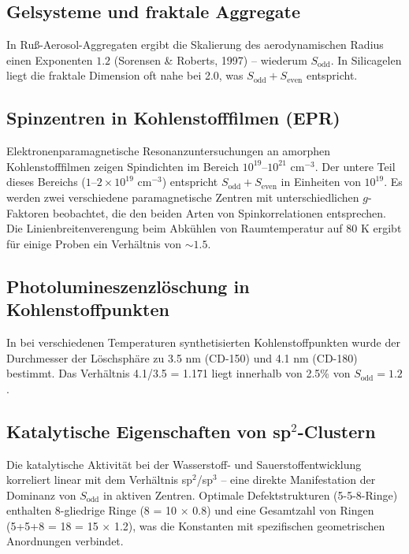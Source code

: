 \documentclass[12pt,a4paper]{article}
\begin{document}
	\subsection{Gelsysteme und fraktale Aggregate}
	In Ruß-Aerosol-Aggregaten ergibt die Skalierung des aerodynamischen Radius einen Exponenten \(1.2\) (Sorensen \& Roberts, 1997) -- wiederum \(S_{\text{odd}}\). In Silicagelen liegt die fraktale Dimension oft nahe bei 2.0, was \(S_{\text{odd}}+S_{\text{even}}\) entspricht.
	
	\subsection{Spinzentren in Kohlenstofffilmen (EPR)}
	Elektronenparamagnetische Resonanzuntersuchungen an amorphen Kohlenstofffilmen zeigen Spindichten im Bereich \(10^{19}\)--\(10^{21}\) cm\({}^{-3}\). Der untere Teil dieses Bereichs (\(1\)--\(2\times10^{19}\) cm\({}^{-3}\)) entspricht \(S_{\text{odd}}+S_{\text{even}}\) in Einheiten von \(10^{19}\). Es werden zwei verschiedene paramagnetische Zentren mit unterschiedlichen \(g\)-Faktoren beobachtet, die den beiden Arten von Spinkorrelationen entsprechen. Die Linienbreitenverengung beim Abkühlen von Raumtemperatur auf 80 K ergibt für einige Proben ein Verhältnis von \(\sim 1.5\).
	
	\subsection{Photolumineszenzlöschung in Kohlenstoffpunkten}
	In bei verschiedenen Temperaturen synthetisierten Kohlenstoffpunkten wurde der Durchmesser der Löschsphäre zu 3.5 nm (CD-150) und 4.1 nm (CD-180) bestimmt. Das Verhältnis 4.1/3.5 = 1.171 liegt innerhalb von 2.5\% von \(S_{\text{odd}}=1.2\).
	
	\subsection{Katalytische Eigenschaften von sp\({}^2\)-Clustern}
	Die katalytische Aktivität bei der Wasserstoff- und Sauerstoffentwicklung korreliert linear mit dem Verhältnis sp\({}^2\)/sp\({}^3\) -- eine direkte Manifestation der Dominanz von \(S_{\text{odd}}\) in aktiven Zentren. Optimale Defektstrukturen (5-5-8-Ringe) enthalten 8-gliedrige Ringe (8 = 10 \(\times\) 0.8) und eine Gesamtzahl von Ringen (5+5+8 = 18 = 15 \(\times\) 1.2), was die Konstanten mit spezifischen geometrischen Anordnungen verbindet.
	
\end{document}

